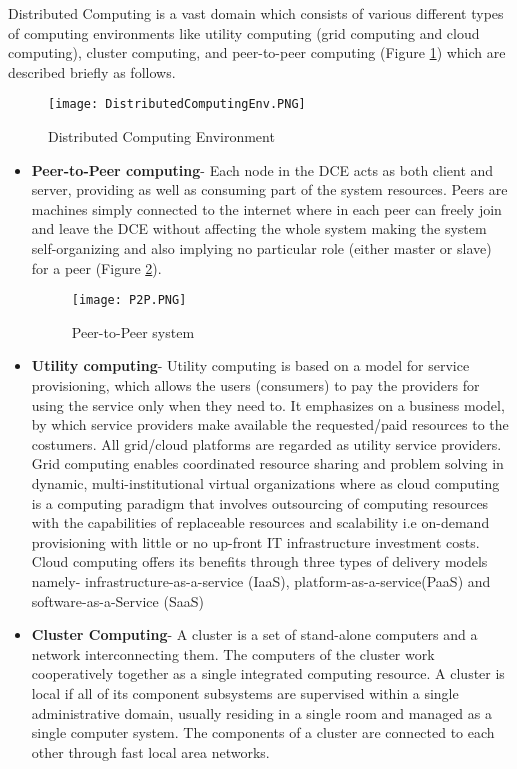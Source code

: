 Distributed Computing is a vast domain which consists of various different types of computing environments like utility computing (grid computing and cloud computing), cluster computing, and peer-to-peer computing (Figure \ref{fig:DistributedComputingEnv}) which are described briefly as follows.

\begin{figure}[ht!]
\centering
\texttt{[image: DistributedComputingEnv.PNG]}
\caption{Distributed Computing Environment}
\label{fig:DistributedComputingEnv}
\end{figure}

\begin{itemize}
\item \textbf{Peer-to-Peer computing}- Each node in the DCE acts as both client and server, providing as well as consuming part of the system resources. Peers are machines simply connected to the internet where in each peer can freely join and leave the DCE without affecting the whole system making the system self-organizing  and also implying no particular role (either master or slave) for a peer (Figure \ref{fig:P2P}).

\begin{figure}[ht!]
\centering
\texttt{[image: P2P.PNG]}
\caption{Peer-to-Peer system}
\label{fig:P2P}
\end{figure}

\item \textbf{Utility computing}- Utility computing is based on a model for service provisioning, which allows the users (consumers) to pay the providers for using the service only when they need to. It emphasizes on a business model, by which service providers make available the requested/paid resources to the costumers. All grid/cloud platforms are regarded as utility service providers. Grid computing enables coordinated resource sharing and problem solving in dynamic, multi-institutional virtual organizations where as cloud computing is a computing paradigm that involves outsourcing of computing resources with the capabilities of  replaceable resources and scalability i.e on-demand provisioning with little or no up-front IT infrastructure investment costs. Cloud computing offers its benefits through three types of delivery models namely- infrastructure-as-a-service (IaaS), platform-as-a-service(PaaS) and software-as-a-Service (SaaS) 

\item \textbf{Cluster Computing}- A cluster is a set of stand-alone computers and a network interconnecting them. The computers of the cluster work cooperatively together as a single integrated computing resource. A cluster is local if all of its component subsystems are supervised within a single administrative domain, usually residing in a single room and managed as a single computer system. The components of a cluster are connected to each other through fast local area networks. 


\end{itemize}
